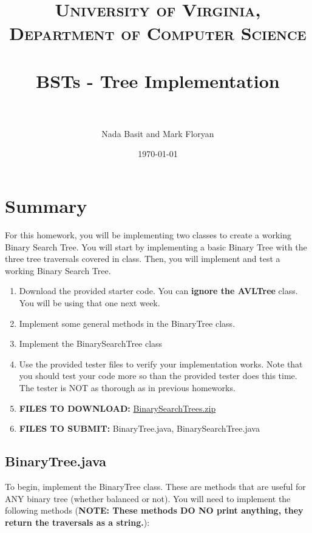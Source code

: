 \documentclass[paper=a4, fontsize=11pt, parskip=full]{scrartcl} %
\title{
\normalfont \normalsize
\textsc{University of Virginia, Department of Computer Science} \\ [25pt] %
\horrule{0.5pt} \\[0.4cm] %
\huge BSTs - Tree Implementation \\ %
\horrule{2pt} \\[0.5cm] %
}
\author{Nada Basit and Mark Floryan}
\date{\normalsize\today} %
\numberwithin{equation}{section} %
\numberwithin{figure}{section} %
\numberwithin{table}{section} %
\begin{document}
\maketitle %


\section{Summary}

For this homework, you will be implementing two classes to create a working Binary Search Tree. You will start by implementing a basic Binary Tree with the three tree traversals covered in class. Then, you will implement and test a working Binary Search Tree.

\begin{enumerate}
	\item Download the provided starter code. You can \textbf{ignore the AVLTree} class. You will be using that one next week.
	\item Implement some general methods in the BinaryTree class.
	\item Implement the BinarySearchTree class
	\item Use the provided tester files to verify your implementation works. Note that you should test your code more so than the provided tester does this time. The tester is NOT as thorough as in previous homeworks.
	\item \textbf{FILES TO DOWNLOAD:} \href{https://uva-cs.github.io/dsa1/homeworks/BinarySearchTrees/code/BinarySearchTrees.zip}{BinarySearchTrees.zip}
	\item \textbf{FILES TO SUBMIT:} BinaryTree.java, BinarySearchTree.java
\end{enumerate}


\subsection{BinaryTree.java}

To begin, implement the BinaryTree class. These are methods that are useful for ANY binary tree (whether balanced or not). You will need to implement the following methods (\textbf{NOTE: These methods DO NO print anything, they return the traversals as a string.}):
\end{document}
